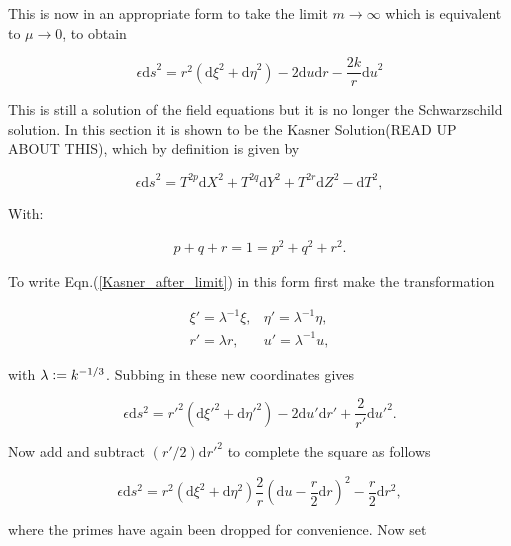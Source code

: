 This is now in an appropriate form to take the limit $m \rightarrow \infty$ which is equivalent to $\mu \rightarrow 0$, to obtain

\begin{equation}\label{Kasner_after_limit}
\epsilon {\mathrm{d}s}^2 = r^2 ({\mathrm{d}\xi}^2 + {\mathrm{d}\eta}^2) - 2 {\mathrm{d}u}{\mathrm{d}r} - \frac{2k}{r} {\mathrm{d}u}^2
\end{equation}

\noindent This is still a solution of the field equations but it is no longer the Schwarzschild solution. In this section it is shown to be the Kasner Solution(READ UP ABOUT THIS), which by definition is given by

\begin{equation*} 
\epsilon {\mathrm{d}s}^2 = T^{2p} {\mathrm{d}X}^2 + T^{2q} \mathrm{d}Y^2 + T^{2r} \mathrm{d}Z^2 - \mathrm{d}T^2,
\end{equation*}

\noindent With:

\begin{eqnarray*}
p + q + r = 1 = p^2 + q^2 + r^2.
\end{eqnarray*}

To write Eqn.(\ref{Kasner_after_limit}) in this form first make the transformation

\begin{align*} 
\xi' = \lambda^{-1} \xi, & \eta' = \lambda^{-1} \eta, \\
r' = \lambda r,          & u' = \lambda^{-1} u,
\end{align*}

\noindent with $\lambda \vcentcolon = k^{-1/3}$. Subbing in these new coordinates gives

\begin{equation*}  
\epsilon \mathrm{d} s^2 = {r'}^2 (\mathrm{d} {\xi'}^2 + \mathrm{d} {\eta'}^2) - 2 \mathrm{d} u' \mathrm{d} r' + \frac{2}{r'}\mathrm{d} {u'}^2.
\end{equation*}

\noindent Now add and subtract $(r'/2) \mathrm{d} {r'}^2$ to complete the square as follows

\begin{equation*}  
\epsilon \mathrm{d} s^2 = r^2 (\mathrm{d} \xi^2 + \mathrm{d} \eta^2) \frac{2}{r}{\left( \mathrm{d} u  - \frac{r}{2} \mathrm{d} r\right)}^2 - \frac{r}{2}\mathrm{d} r^2,
\end{equation*}

\noindent where the primes have again been dropped for convenience. Now set

